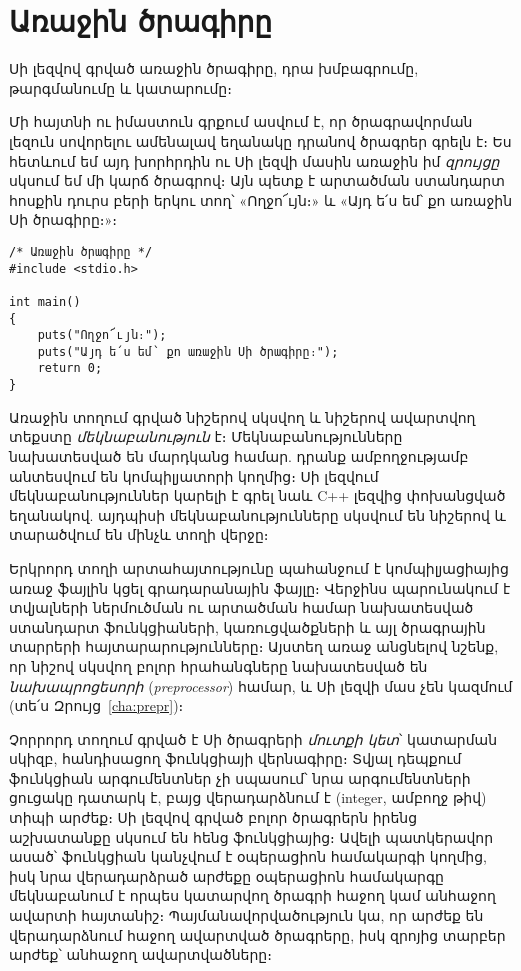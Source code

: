 \chapter{Առաջին ծրագիրը}

\begin{epigraph}
Սի լեզվով գրված առաջին ծրագիրը, դրա խմբագրումը,
թարգմանումը և կատարումը։
\end{epigraph}

Մի հայտնի ու իմաստուն գրքում \cite{krc} ասվում է, որ ծրագրավորման
լեզուն սովորելու ամենալավ եղանակը դրանով ծրագրեր գրելն է։ Ես հետևում
եմ այդ խորհրդին ու Սի լեզվի մասին առաջին իմ \emph{զրույցը} սկսում
եմ մի կարճ ծրագրով։ Այն պետք է արտածման ստանդարտ հոսքին դուրս բերի
երկու տող՝ «Ողջո՜ւյն։» և «Այդ ե՛ս եմ՝ քո առաջին Սի ծրագիրը։»։

\begin{Verbatim}
/* Առաջին ծրագիրը */
#include <stdio.h>

int main()
{
    puts("Ողջո՜ւյն։");
    puts("Այդ ե՛ս եմ՝ քո առաջին Սի ծրագիրը։");
    return 0;
}
\end{Verbatim}

Առաջին տողում գրված \code{/*} նիշերով սկսվող և \code{*/} նիշերով
ավարտվող տեքստը \emph{մեկնաբանություն} է։
Մեկնաբանությունները նախատեսված են մարդկանց հա\-մար. դրանք
ամբողջությամբ անտեսվում են կոմպիլյատորի կողմից։ Սի լեզվում
մեկնաբանություններ կարելի է գրել նաև C++ լեզվից փոխանցված եղանակով.
այդպիսի մեկնաբանությունները սկսվում են \code{//} նիշերով և տարածվում
են մինչև տողի վերջը։

Երկրորդ տողի  արտահայտությունը պահանջում
է կոմ\-պիլյացիայից առաջ  ֆայլին կցել գրադարանային
 ֆայլը։ Վերջինս պարունակում է տվյալների ներմուծման ու
արտածման համար նա\-խատեսված ստանդարտ ֆունկցիաների, կառուցվածքների և
այլ ծրագրային տարրերի հայտարարությունները։ Այստեղ առաջ անցնելով
նշենք, որ \code{\#} նիշով սկսվող բոլոր հրահանգները նախատեսված են
\emph{նախապրոցեսորի} (\emph{preprocessor}) համար,
և Սի լեզվի մաս չեն կազմում (տե՛ս Զրույց~\ref{cha:prepr})։

Չորրորդ տողում գրված է Սի ծրագրերի \emph{մուտքի կետ}՝ կատարման
սկիզբ, հանդիսացող  ֆունկցիայի վերնագիրը։
Տվյալ դեպքում  ֆունկցիան արգումենտներ չի սպասում՝ նրա
արգումենտների ցուցակը դատարկ է, բայց վերադարձնում է 
(integer, ամբողջ թիվ) տիպի արժեք։ Սի լեզվով գրված բոլոր ծրագրերն
իրենց աշխատանքը սկսում են հենց  ֆունկցիայից։ Ավելի
պատկերավոր ասած՝  ֆունկցիան կանչվում է օպերացիոն
համակարգի կողմից, իսկ նրա վերադարձրած արժեքը օպերացիոն համակարգը
մեկնաբա\-նում է որպես կատարվող ծրագրի հաջող կամ անհաջող ավարտի
հայտանիշ։ Պայ\-մանավորվածություն կա, որ  արժեք են
վերադարձնում հաջող ավարտված ծրագրերը, իսկ զրոյից տարբեր արժեք՝
անհաջող ավարտվածները։


